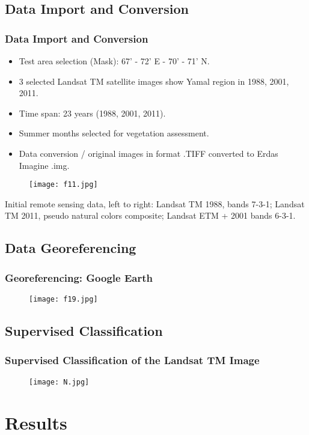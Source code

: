 \documentclass[pdflatex,compress,8pt,
	xcolor={dvipsnames,dvipsnames,svgnames,x11names,table},
	hyperref={colorlinks = true,breaklinks = true, urlcolor = NavyBlue, breaklinks = true}]{beamer}
\begin{document}
\subsection{Data Import and Conversion}
\begin{frame}\frametitle{Data Import and Conversion}
\begin{itemize}
        \item Test area selection (Mask): 67' - 72' E - 70' - 71' N. 
	\item 3 selected  Landsat TM satellite images show Yamal region in 1988, 2001, 2011.
	\item Time span: 23 years (1988, 2001, 2011). 
	\item Summer months selected for vegetation assessment. 
	\item Data conversion / original images in format .TIFF converted to Erdas Imagine .img.
\end{itemize}
\begin{figure}[H]
	\centering
		\texttt{[image: f11.jpg]}
\end{figure}
Initial remote sensing data, left to right: Landsat TM 1988, bands 7-3-1; Landsat TM 2011, pseudo natural colors composite; Landsat ETM + 2001 bands 6-3-1.
\end{frame}

\subsection{Data Georeferencing}
\begin{frame}\frametitle{Georeferencing: Google Earth}
\begin{figure}[H]
	\centering
		\texttt{[image: f19.jpg]}
\end{figure}
\end{frame}

\subsection{Supervised Classification}
\begin{frame}\frametitle{Supervised Classification of the Landsat TM Image}
\begin{figure}[H]
	\centering
		\texttt{[image: N.jpg]}
\end{figure}
\end{frame}

\section{Results}
\end{document}
